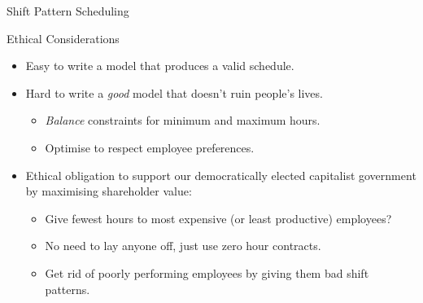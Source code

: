 \documentclass[aspectratio=169,compress,10pt]{beamer}
\begin{document}
\begin{frame}{Shift Pattern Scheduling}
    \vspace*{-0.5em}%
    \only<4>{
        }%
    \only<5>{
        }%
\end{frame}

\begin{frame}{Ethical Considerations}
    \begin{itemize}
        \item Easy to write a model that produces a valid schedule.
        \item Hard to write a \emph{good} model that doesn't ruin people's lives.
            \begin{itemize}
                \item \emph{Balance} constraints for minimum and maximum hours.
                \item Optimise to respect employee preferences.
            \end{itemize}
        \item <2-> Ethical obligation to support our democratically elected
            capitalist government by maximising shareholder value:
            \begin{itemize}
                \item <2-> Give fewest hours to most expensive (or least productive) employees?
                \item <2-> No need to lay anyone off, just use zero hour contracts.
                \item <2-> Get rid of poorly performing employees by giving them
                    bad shift patterns.
            \end{itemize}
    \end{itemize}
\end{frame}
\end{document}
